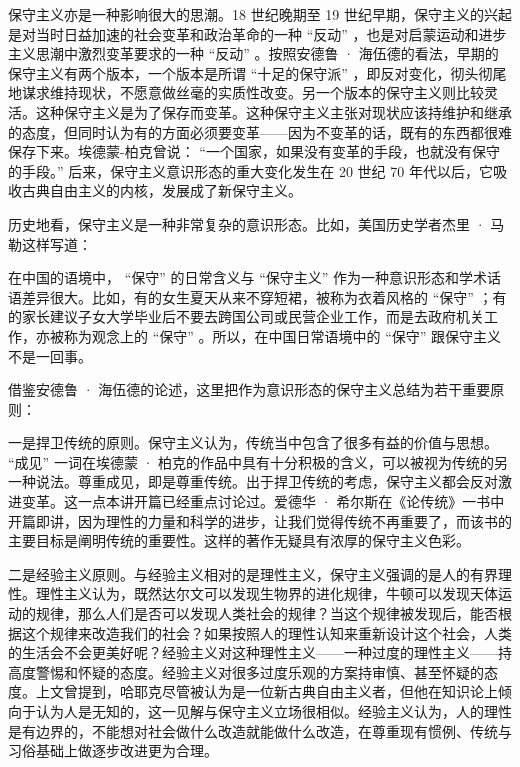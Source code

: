 
保守主义亦是一种影响很大的思潮。18 世纪晚期至 19 世纪早期，保守主义的兴起是对当时日益加速的社会变革和政治革命的一种 “反动” ，也是对启蒙运动和进步主义思潮中激烈变革要求的一种 “反动” 。按照安德鲁 · 海伍德的看法，早期的保守主义有两个版本，一个版本是所谓 “十足的保守派” ，即反对变化，彻头彻尾地谋求维持现状，不愿意做丝毫的实质性改变。另一个版本的保守主义则比较灵活。这种保守主义是为了保存而变革。这种保守主义主张对现状应该持维护和继承的态度，但同时认为有的方面必须要变革——因为不变革的话，既有的东西都很难保存下来。埃德蒙-柏克曾说： “一个国家，如果没有变革的手段，也就没有保守的手段。” 后来，保守主义意识形态的重大变化发生在 20 世纪 70 年代以后，它吸收古典自由主义的内核，发展成了新保守主义。

历史地看，保守主义是一种非常复杂的意识形态。比如，美国历史学者杰里 · 马勒这样写道：


在中国的语境中， “保守” 的日常含义与 “保守主义” 作为一种意识形态和学术话语差异很大。比如，有的女生夏天从来不穿短裙，被称为衣着风格的 “保守” ；有的家长建议子女大学毕业后不要去跨国公司或民营企业工作，而是去政府机关工作，亦被称为观念上的 “保守” 。所以，在中国日常语境中的 “保守” 跟保守主义不是一回事。

借鉴安德鲁 · 海伍德的论述，这里把作为意识形态的保守主义总结为若干重要原则：

一是捍卫传统的原则。保守主义认为，传统当中包含了很多有益的价值与思想。 “成见” 一词在埃德蒙 · 柏克的作品中具有十分积极的含义，可以被视为传统的另一种说法。尊重成见，即是尊重传统。出于捍卫传统的考虑，保守主义都会反对激进变革。这一点本讲开篇已经重点讨论过。爱德华 · 希尔斯在《论传统》一书中开篇即讲，因为理性的力量和科学的进步，让我们觉得传统不再重要了，而该书的主要目标是阐明传统的重要性。这样的著作无疑具有浓厚的保守主义色彩。

二是经验主义原则。与经验主义相对的是理性主义，保守主义强调的是人的有界理性。理性主义认为，既然达尔文可以发现生物界的进化规律，牛顿可以发现天体运动的规律，那么人们是否可以发现人类社会的规律？当这个规律被发现后，能否根据这个规律来改造我们的社会？如果按照人的理性认知来重新设计这个社会，人类的生活会不会更美好呢？经验主义对这种理性主义——一种过度的理性主义——持高度警惕和怀疑的态度。经验主义对很多过度乐观的方案持审慎、甚至怀疑的态度。上文曾提到，哈耶克尽管被认为是一位新古典自由主义者，但他在知识论上倾向于认为人是无知的，这一见解与保守主义立场很相似。经验主义认为，人的理性是有边界的，不能想对社会做什么改造就能做什么改造，在尊重现有惯例、传统与习俗基础上做逐步改进更为合理。

